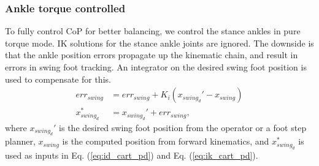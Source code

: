 \documentclass{ws-ijhr}
\newcommand{\eref}[1] {Eq. (\ref{#1})}
\begin{document}
\subsubsection{Ankle torque controlled}
To fully control CoP for better balancing, we control the stance 
ankles in pure torque mode. IK solutions for the stance ankle joints are 
ignored. The downside is that the ankle position errors propagate up the 
kinematic chain, and result in errors in swing foot tracking. An integrator on 
the desired swing foot position is used to compensate for this. 
\begin{equation}
  \label{eq:int}
  \begin{split}
    err_{swing} &= err_{swing} + K_i(x_{swing_d}' - x_{swing}) \\
    x_{swing_d}^* &= x_{swing_d}' + err_{swing},
  \end{split}
\end{equation}  
where $x_{swing_d}'$ is the desired swing foot position from the operator or a 
foot step planner, 
$x_{swing}$ is 
the computed position from forward kinematics, and $x_{swing_d}^*$ is used 
as inputs in \eref{eq:id_cart_pd} and \eref{eq:ik_cart_pd}. 
 
 
\end{document}
